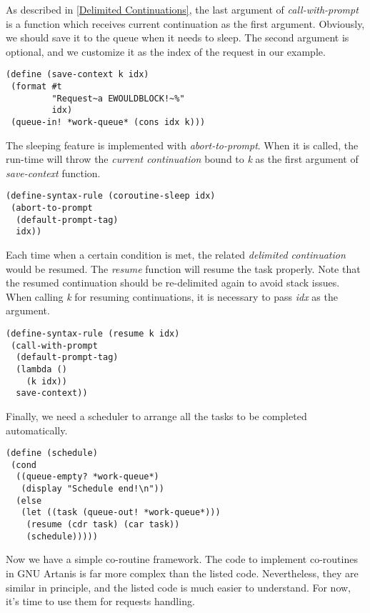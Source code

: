 \documentclass[numbers,numberedpars]{sigplanconf}
\begin{document}
As described in \ref{Delimited Continuations}, the last argument of {\it call-with-prompt} is a function which receives current continuation as the first argument. Obviously, we should save it to the queue when it needs to sleep. The second argument is optional, and we customize it as the index of the request in our example.

\begin{lstlisting}
(define (save-context k idx)
 (format #t
         "Request~a EWOULDBLOCK!~%"
         idx)
 (queue-in! *work-queue* (cons idx k)))
\end{lstlisting}

The sleeping feature is implemented with {\it abort-to-prompt}. When it is called, the run-time will throw the {\it current continuation} bound to {\it k} as the first argument of {\it save-context} function.

\begin{lstlisting}
(define-syntax-rule (coroutine-sleep idx)
 (abort-to-prompt
  (default-prompt-tag)
  idx))
\end{lstlisting}

Each time when a certain condition is met, the related {\it delimited continuation} would be resumed. The {\it resume} function will resume the task properly. Note that the resumed continuation should be re-delimited again to avoid stack issues. When calling {\it k} for resuming continuations, it is necessary to pass {\it idx} as the argument.

\begin{lstlisting}
(define-syntax-rule (resume k idx)
 (call-with-prompt
  (default-prompt-tag)
  (lambda ()
    (k idx))
  save-context))
\end{lstlisting}

Finally, we need a scheduler to arrange all the tasks to be completed automatically.

\begin{lstlisting}
(define (schedule)
 (cond
  ((queue-empty? *work-queue*)
   (display "Schedule end!\n"))
  (else
   (let ((task (queue-out! *work-queue*)))
    (resume (cdr task) (car task))
    (schedule)))))
\end{lstlisting}

Now we have a simple co-routine framework. The code to implement co-routines in GNU Artanis is far more complex than the listed code. Nevertheless, they are similar in principle, and the listed code is much easier to understand. For now, it's time to use them for requests handling.
\end{document}
